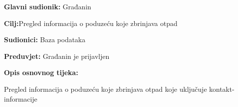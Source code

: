 				\noindent {}
				\begin{packed_item}
					
					\item \textbf{Glavni sudionik: }Građanin
					\item  \textbf{Cilj:}Pregled informacija o poduzeću koje zbrinjava otpad
					\item  \textbf{Sudionici:} Baza podataka
					\item  \textbf{Preduvjet:} Građanin je prijavljen
					\item  \textbf{Opis osnovnog tijeka:}
					
					\item[] \begin{packed_enum}
						
						\item Pregled informacija o poduzeću koje zbrinjava otpad koje uključuje kontakt-informacije
					\end{packed_enum}
				\end{packed_item}
			

